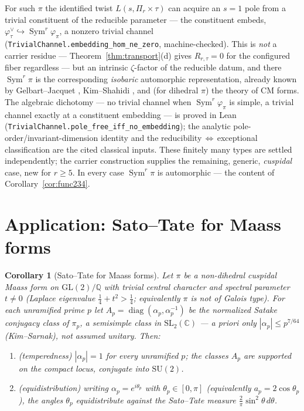 \documentclass[11pt]{article}
\newtheorem{corollary}[theorem]{Corollary}
\theoremstyle{definition}
\newcommand{\Sym}{\operatorname{Sym}}
\begin{document}
For such $\pi$ the identified twist $L(s,\Pi_r\times\tau)$ can acquire an $s=1$ pole from a trivial constituent
of the reducible parameter --- the constituent embeds, $\varphi_\tau^\vee\hookrightarrow\Sym^r\varphi_\pi$, a
nonzero trivial channel (\texttt{TrivialChannel.embedding\_hom\_ne\_zero}, machine-checked). This is \emph{not}
a carrier residue --- Theorem~\ref{thm:transport}(d) gives $R_{r,\tau}=0$ for the configured fiber regardless
--- but an intrinsic $\zeta$-factor of the reducible datum, and there $\Sym^r\pi$ is the corresponding
\emph{isobaric} automorphic representation, already known by Gelbart--Jacquet \cite{GJ}, Kim--Shahidi
\cite{KimShahidi}, and (for dihedral $\pi$) the theory of CM forms. The algebraic dichotomy --- no trivial
channel when $\Sym^r\varphi_\pi$ is simple, a trivial channel exactly at a constituent embedding --- is proved
in Lean (\texttt{TrivialChannel.pole\_free\_iff\_no\_embedding}); the analytic pole-order/invariant-dimension
identity and the reducibility$\,\Leftrightarrow\,$exceptional classification are the cited classical inputs.
These finitely many types are settled independently; the carrier construction supplies the remaining, generic,
\emph{cuspidal} case, new for $r\ge5$. In every case $\Sym^r\pi$ is automorphic --- the content of
Corollary~\ref{cor:func234}.

\section{Application: Sato--Tate for Maass forms}\label{sec:cps-satotate}
\begin{corollary}[Sato--Tate for Maass forms]\label{cor:satotate}
Let $\pi$ be a non-dihedral cuspidal Maass form on $\mathrm{GL}(2)/\mathbb Q$ with trivial central
character and spectral parameter $t\neq0$ (Laplace eigenvalue $\tfrac14+t^2>\tfrac14$; equivalently $\pi$ is not
of Galois type). For each unramified prime $p$ let
$A_p=\operatorname{diag}(\alpha_p,\alpha_p^{-1})$ be the normalized Satake conjugacy class of $\pi_p$, a
semisimple class in $\mathrm{SL}_2(\mathbb C)$ --- a priori only $|\alpha_p|\le p^{7/64}$ (Kim--Sarnak),
\emph{not} assumed unitary. Then:
\begin{enumerate}
\item[\textup{(i)}] \emph{(temperedness)} $|\alpha_p|=1$ for every unramified $p$; the classes $A_p$ are
supported on the compact locus, conjugate into $\mathrm{SU}(2)$.
\item[\textup{(ii)}] \emph{(equidistribution)} writing $\alpha_p=e^{i\theta_p}$ with $\theta_p\in[0,\pi]$
(equivalently $a_p=2\cos\theta_p$), the angles $\theta_p$ equidistribute against the Sato--Tate measure
$\tfrac2\pi\sin^2\theta\,d\theta$.
\end{enumerate}
\end{corollary}
\end{document}
